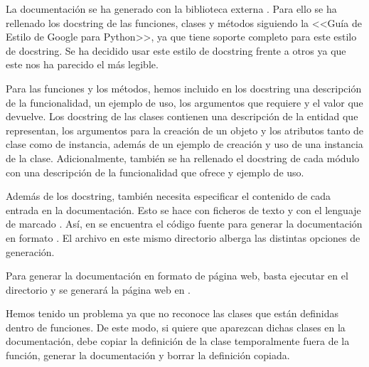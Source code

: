 La documentación se ha generado con la biblioteca externa . Para ello se ha rellenado los docstring de las funciones, clases y métodos siguiendo la <<Guía de Estilo de Google para Python>>, ya que  tiene soporte completo para este estilo de docstring. Se ha decidido usar este estilo de docstring frente a otros ya que este nos ha parecido el más legible.

Para las funciones y los métodos, hemos incluido en los docstring una descripción de la funcionalidad, un ejemplo de uso, los argumentos que requiere y el valor que devuelve. Los docstring de las clases contienen una descripción de la entidad que representan, los argumentos para la creación de un objeto y los atributos tanto de clase como de instancia, además de un ejemplo de creación y uso de una instancia de la clase. Adicionalmente, también se ha rellenado el docstring de cada módulo con una descripción de la funcionalidad que ofrece y ejemplo de uso.

Además de los docstring,  también necesita especificar el contenido de cada entrada en la documentación. Esto se hace con ficheros de texto y con el lenguaje de marcado . Así, en  se encuentra el código fuente para generar la documentación en formato . El archivo  en este mismo directorio alberga las distintas opciones de generación.

Para generar la documentación en formato de página web, basta ejecutar  en el directorio  y  se generará la página web en .

Hemos tenido un problema ya que  no reconoce las clases que están definidas dentro de funciones. De este modo, si quiere que aparezcan dichas clases en la documentación, debe copiar la definición de la clase temporalmente fuera de la función, generar la documentación y borrar la definición copiada.
